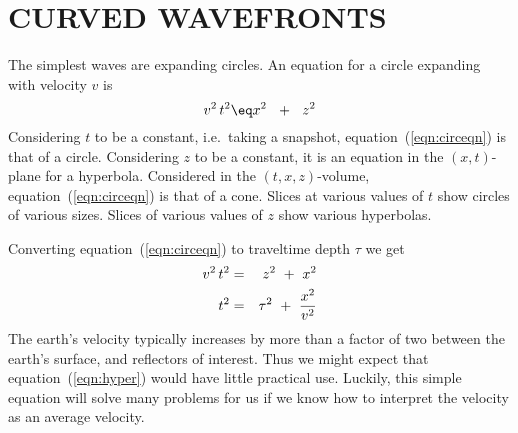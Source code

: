 \section{CURVED WAVEFRONTS}
The simplest waves are expanding circles.
An equation for a circle expanding with velocity  $v$
is
\begin{equation}
v^2 \, t^2  \eq  x^2 \ \ +\ \ z^2 
\label{eqn:circeqn}
\end{equation}
Considering  $t$  to be a constant,
i.e.~taking a snapshot, equation~(\ref{eqn:circeqn}) is that of a circle.
Considering  $z$  to be a constant,
it is an equation in the $(x , t)$-plane for a hyperbola.
Considered in the $(t , x , z)$-volume,
equation~(\ref{eqn:circeqn}) is that of a cone.
Slices at various values of  $t$  show circles of various sizes.
Slices of various values of  $z$  show various hyperbolas.
\par
Converting equation~(\ref{eqn:circeqn})
to traveltime depth $\tau$ we get
\begin{eqnarray}
v^2 \, t^2 &=& z^2 \ +\  x^2 \\
t^2        &=& \tau^2 \ +\ { x^2   \over  v^2 } 
\label{eqn:hyper}
\end{eqnarray}
The earth's velocity typically increases
by more than a factor of two between the earth's surface,
and reflectors of interest.
Thus we might expect that equation~(\ref{eqn:hyper}) would have little
practical use.
Luckily, this simple equation will solve many problems for us
if we know how to interpret the velocity as an average velocity.

